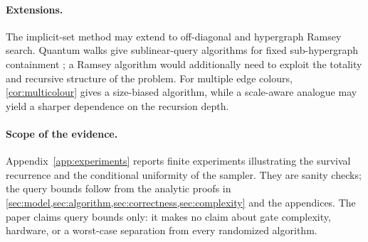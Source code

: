 \paragraph{Extensions.}
The implicit-set method may extend to off-diagonal and hypergraph Ramsey
search.  Quantum walks give sublinear-query algorithms for fixed
sub-hypergraph containment \cite{LeGallNishimuraTani2016}; a Ramsey
algorithm would additionally need to exploit the totality and recursive
structure of the problem.  For multiple edge colours, \cref{cor:multicolour}
gives a size-biased algorithm, while a scale-aware analogue may yield a
sharper dependence on the recursion depth.

\paragraph{Scope of the evidence.}
Appendix~\ref{app:experiments} reports finite experiments illustrating the
survival recurrence and the conditional uniformity of the sampler.  They are
sanity checks; the query bounds follow from the analytic proofs in
\cref{sec:model,sec:algorithm,sec:correctness,sec:complexity} and the
appendices.  The paper claims query bounds only: it makes no claim about
gate complexity, hardware, or a worst-case separation from every
randomized algorithm.
